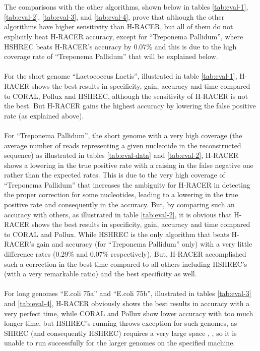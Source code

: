 \documentclass[12pt,openany]{llncs}
\begin{document}
\\\\
The comparisons with the other algorithms, shown below in tables \ref{tab:eval-1}, \ref{tab:eval-2}, \ref{tab:eval-3}, and \ref{tab:eval-4}, prove that although the other algorithms have higher sensitivity than H-RACER, but all of them do not explicitly beat H-RACER accuracy, except for \enquote{Treponema Pallidum}, where HSHREC beats H-RACER's accuracy by 0.07\% and this is due to the high coverage rate of \enquote{Treponema Pallidum} that will be explained below.  
\\\\
For the short genome \enquote{Lactococcus Lactis}, illustrated in table \ref{tab:eval-1}, H-RACER shows the best results in specificity, gain, accuracy and time compared to CORAL, Pollux and HSHREC, although the sensitivity of H-RACER is not the best. But H-RACER gains the highest accuracy by lowering the false positive rate (as explained above).
\\\\ 
For \enquote{Treponema Pallidum}, the short genome with a very high coverage (the average number of reads representing a given nucleotide in the reconstructed sequence) as illustrated in tables \ref{tab:eval-data} and \ref{tab:eval-2}, H-RACER shows a lowering in the true positive rate with a raising in the false negative one rather than the expected rates. This is due to the very high coverage of \enquote{Treponema Pallidum} that increases the ambiguity for H-RACER in detecting the proper correction for some nucleotides, leading to a lowering in the true positive rate and consequently in the accuracy. But, by comparing such an accuracy with others, as illustrated in table \ref{tab:eval-2}, it is obvious that H-RACER shows the best results in specificity, gain, accuracy and time compared to CORAL and Pollux. While HSHREC is the only algorithm that beats H-RACER's gain and accuracy (for \enquote{Treponema Pallidum} only) with a very little difference rates (0.29\% and 0.07\% respectively). But, H-RACER accomplished such a correction in the best time compared to all others including HSHREC's (with a very remarkable ratio) and the best specificity as well.
\\\\
For long genomes \enquote{E.coli 75a} and \enquote{E.coli 75b}, illustrated in tables \ref{tab:eval-3} and \ref{tab:eval-4}, H-RACER obviously shows the best results in accuracy with a very perfect time, while CORAL and Pollux show lower accuracy with too much longer time, but HSHREC's running throws exception for such genomes, as SHREC (and consequently HSHREC) requires a very large space \cite{Racer}, \cite{HShrec}, so it is unable to run successfully for the larger genomes on the specified machine.
\end{document}
